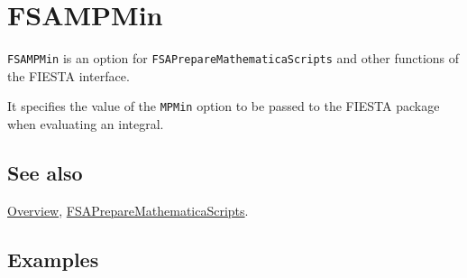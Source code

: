 \documentclass[../FeynHelpersManual.tex]{subfiles}
\begin{document}
\begin{Shaded}
\begin{Highlighting}[]
 
\end{Highlighting}
\end{Shaded}

\hypertarget{fsampmin}{
\section{FSAMPMin}\label{fsampmin}}

\texttt{FSAMPMin} is an option for \texttt{FSAPrepareMathematicaScripts}
and other functions of the FIESTA interface.

It specifies the value of the \texttt{MPMin} option to be passed to the
FIESTA package when evaluating an integral.

\subsection{See also}

\hyperlink{toc}{Overview},
\hyperlink{fsapreparemathematicascripts}{FSAPrepareMathematicaScripts}.

\subsection{Examples}
\end{document}
